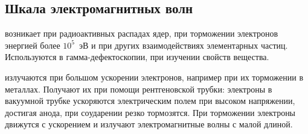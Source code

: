 \subsection{Шкала электромагнитных волн}

 возникает при радиоактивных распадах ядер, при торможении электронов энергией более $10^5$~эВ и при других взаимодействиях элементарных частиц. Используются в гамма-дефектоскопии, при изучении свойств вещества.

 излучаются при большом ускорении электронов, например при их торможении в металлах. Получают их при помощи рентгеновской трубки: электроны в вакуумной трубке ускоряются электрическим полем при высоком напряжении, достигая анода, при со­ударении резко тормозятся. При торможении электроны движут­ся с ускорением и излучают электромагнитные волны с малой длиной.

